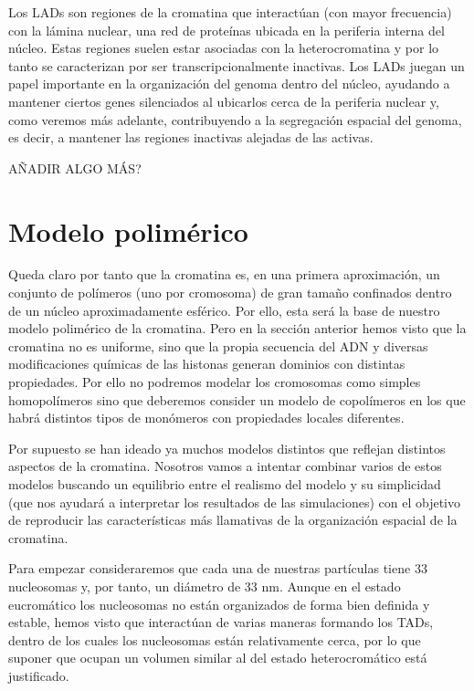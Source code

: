 Los LADs son regiones de la cromatina que interactúan (con mayor frecuencia) con la lámina nuclear, una red de proteínas ubicada en la periferia interna del núcleo. Estas regiones suelen estar asociadas con la heterocromatina y por lo tanto se caracterizan por ser transcripcionalmente inactivas. Los LADs juegan un papel importante en la organización del genoma dentro del núcleo, ayudando a mantener ciertos genes silenciados al ubicarlos cerca de la periferia nuclear y, como veremos más adelante, contribuyendo a la segregación espacial del genoma, es decir, a mantener las regiones inactivas alejadas de las activas.

AÑADIR ALGO MÁS?

\section{Modelo polimérico}

Queda claro por tanto que la cromatina es, en una primera aproximación, un conjunto de polímeros (uno por cromosoma) de gran tamaño confinados dentro de un núcleo aproximadamente esférico. Por ello, esta será la base de nuestro modelo polimérico de la cromatina. Pero en la sección anterior hemos visto que la cromatina no es uniforme, sino que la propia secuencia del ADN y diversas modificaciones químicas de las histonas generan dominios con distintas propiedades. Por ello no podremos modelar los cromosomas como simples homopolímeros sino que deberemos consider un modelo de copolímeros en los que habrá distintos tipos de monómeros con propiedades locales diferentes.

Por supuesto se han ideado ya muchos modelos distintos que reflejan distintos aspectos de la cromatina. Nosotros vamos a intentar combinar varios de estos modelos buscando un equilibrio entre el realismo del modelo y su simplicidad (que nos ayudará a interpretar los resultados de las simulaciones) con el objetivo de reproducir las características más llamativas de la organización espacial de la cromatina.

Para empezar consideraremos que cada una de nuestras partículas tiene 33 nucleosomas y, por tanto, un diámetro de 33 nm. Aunque en el estado eucromático los nucleosomas no están organizados de forma bien definida y estable, hemos visto que interactúan de varias maneras formando los TADs, dentro de los cuales los nucleosomas están relativamente cerca, por lo que suponer que ocupan un volumen similar al del estado heterocromático está justificado.

